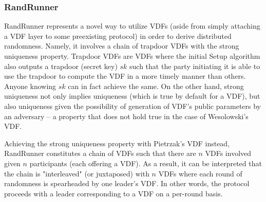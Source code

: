 \documentclass[11pt]{article}
\theoremstyle{definition}
\theoremstyle{remark}
\begin{document}
\subsubsection{RandRunner}
RandRunner represents a novel way to utilize VDFs (aside from simply attaching a VDF layer to some preexisting protocol) in order to derive distributed randomness. Namely, it involves a chain of trapdoor VDFs with the strong uniqueness property. Trapdoor VDFs are VDFs where the initial Setup algorithm also outputs a trapdoor (secret key) $sk$ such that the party initiating it is able to use the trapdoor to compute the VDF in a more timely manner than others. Anyone knowing $sk$ can in fact achieve the same. On the other hand, strong uniqueness not only implies uniqueness (which is true by default for a VDF), but also uniqueness given the possibility of generation of VDF's public parameters by an adversary -- a property that does not hold true in the case of Wesolowski's VDF.


Achieving the strong uniqueness property with Pietrzak's VDF instead, RandRunner constitutes a chain of VDFs such that there are $n$ VDFs involved given $n$ participants (each offering a VDF). As a result, it can be interpreted that the chain is "interleaved" (or juxtaposed) with $n$ VDFs where each round of randomness is spearheaded by one leader's VDF. In other words, the protocol proceeds with a leader corresponding to a VDF on a per-round basis.
\end{document}
